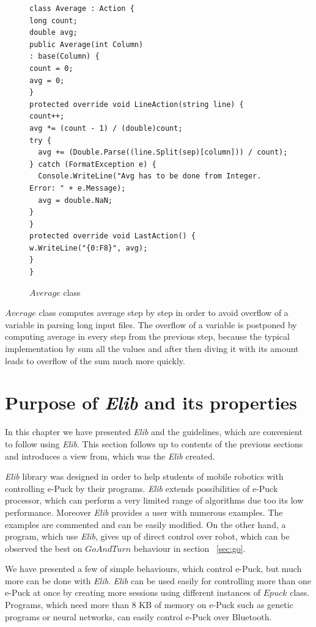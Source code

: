 \begin{figure}[!hbp]
\begin{lstlisting}
class Average : Action {
long count;
double avg;
public Average(int Column)
: base(Column) {
count = 0;
avg = 0;
}
protected override void LineAction(string line) {
count++;
avg *= (count - 1) / (double)count;
try {
  avg += (Double.Parse((line.Split(sep)[column])) / count);
} catch (FormatException e) {
  Console.WriteLine("Avg has to be done from Integer. Error: " + e.Message);
  avg = double.NaN;
}
}
protected override void LastAction() {
w.WriteLine("{0:F8}", avg);
}
}
\end{lstlisting}
\caption{$Average$ class}\label{average}
\end{figure}

  $Average$ class computes average step by step in order to avoid 
  overflow of a variable in parsing long input files. The overflow
  of a variable is postponed by computing average in every step from the previous step, 
  because the typical implementation by sum all the values and after then diving it 
  with its amount leads to overflow of the sum much more quickly.

\section{Purpose of {\it Elib} and its properties}
  In this chapter we have presented {\it Elib} and the guidelines, which are convenient to follow using {\it Elib}. 
  This section follows up to contents of the previous sections and introduces a view from,
  which was the {\it Elib} created.

  {\it Elib} library was designed in order to help students of mobile robotics	with controlling e-Puck by their programs.
  {\it Elib} extends possibilities of e-Puck processor, which can perform a very limited range of algorithms
  due too its low performance.
  Moreover {\it Elib} provides a user with numerous examples. The examples are commented
  and can be easily modified.
  On the other hand, a program, which use {\it Elib}, gives up of direct control over robot,
  which can be observed the best on $GoAndTurn$ behaviour in section ~\ref{sec:go}.

  We have presented a few of simple behaviours, which control e-Puck, but much more can be done with {\it Elib}.
  {\it Elib} can be used easily for controlling more than one e-Puck at once by creating more sessions using
  different instances of $Epuck$ class. Programs, which need more than 8 KB of memory on e-Puck such 
  as genetic programs or neural networks, can easily control e-Puck over Bluetooth.


